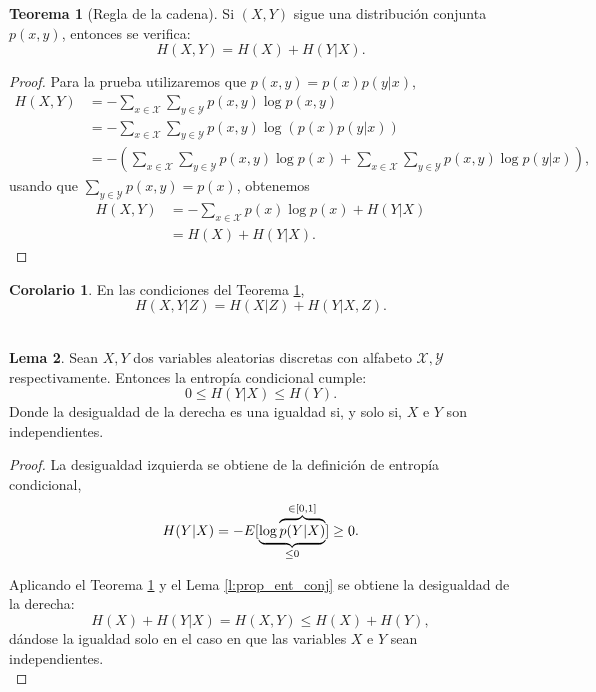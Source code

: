 \documentclass[12pt,a4paper]{report} %
\theoremstyle{definition}
\newtheorem{theorem}{Teorema}[section]
\newtheorem{lemma}[theorem]{Lema}
\newtheorem{corollary}{Corolario}[theorem]
\begin{document}
\begin{theorem}[Regla de la cadena]\label{t:regla_cadena}
  Si $(X,Y)$ sigue una distribución conjunta $p(x,y)$, entonces se verifica:\[
H(X,Y) = H(X) + H(Y|X).
  \]
\end{theorem}

\begin{proof}
Para la prueba utilizaremos que $p(x,y) = p(x)p(y|x)$,
  \begin{align*}
    H(X,Y) &= - \sum_{x \in \mathcal{X}} \sum_{y \in \mathcal{Y}} p(x,y) \log p(x,y)\\[5pt] &= - \sum_{x \in \mathcal{X}} \sum_{y \in \mathcal{Y}} p(x,y) \log \left( p(x)p(y|x) \right )\\[3pt]
    &= - \left(\sum_{x \in \mathcal{X}} \sum_{y \in \mathcal{Y}} p(x,y) \log p(x) + \sum_{x \in \mathcal{X}} \sum_{y \in \mathcal{Y}} p(x,y) \log p(y|x) \right ),
  \end{align*}
usando que $\sum_{y\in \mathcal{Y}}p(x,y) = p(x)$, obtenemos
\begin{align*}
  H(X,Y) &= - \sum_{x \in \mathcal{X}} p(x) \log p(x) + H(Y|X)\\
    &= H(X) + H(Y|X).
  \end{align*}
\end{proof}

\begin{corollary} En las condiciones del Teorema \ref{t:regla_cadena},\[
H(X,Y|Z) = H(X|Z) + H(Y|X, Z).
  \]\\[-10pt]
\end{corollary}

\begin{lemma}
  Sean $X, Y$ dos variables aleatorias discretas con alfabeto $\mathcal{X}, \mathcal{Y}$ respectivamente. Entonces la entropía condicional cumple:\[
0 \leq H(Y|X) \leq H(Y).
\]
Donde la desigualdad de la derecha es una igualdad si, y solo si, $X$ e $Y$ son independientes.
\end{lemma}

\begin{proof}
  La desigualdad izquierda se obtiene de la definición de entropía condicional, \[H(Y|X) = - \relax{E} [\underbrace{\log \overbrace{p(Y|X)}^{\in [0,1]}}_{\leq 0} ]\ge 0.\]

  Aplicando el Teorema \ref{t:regla_cadena} y el Lema \ref{l:prop_ent_conj} se obtiene la desigualdad de la derecha:\[
H(X) + H(Y|X) = H(X,Y) \leq H(X) + H(Y),
\]
dándose la igualdad solo en el caso en que las variables $X$ e $Y$ sean independientes.\\
\end{proof}
\end{document}
